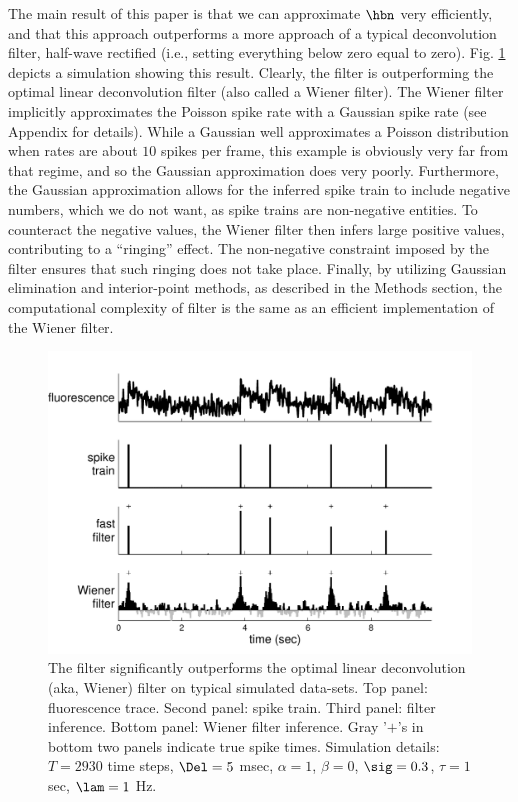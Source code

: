 The main result of this paper is that we can approximate $\hbn$ very efficiently, and that this approach outperforms a more \naive approach of a typical deconvolution filter, half-wave rectified (i.e., setting everything below zero equal to zero).  Fig. \ref{fig:woopsi_inf} depicts a simulation showing this result. Clearly, the \foopsi filter is outperforming the optimal linear deconvolution filter (also called a Wiener filter).  The Wiener filter implicitly approximates the Poisson spike rate with a Gaussian spike rate (see Appendix for details). While a Gaussian well approximates a Poisson distribution when rates are about $10$ spikes per frame, this example is obviously very far from that regime, and so the Gaussian approximation does very poorly. Furthermore, the Gaussian approximation allows for the inferred spike train to include negative numbers, which we do not want, as spike trains are non-negative entities.  To counteract the negative values, the Wiener filter then infers large positive values, contributing to a ``ringing'' effect.  The non-negative constraint imposed by the \foopsi filter ensures that such ringing does not take place.  Finally, by utilizing Gaussian elimination and interior-point methods, as described in the Methods section, the computational complexity of \foopsi filter is the same as an efficient implementation of the Wiener filter.  


\begin{figure}[h!]
\centering \includegraphics[width=.9\linewidth]{../figs/woopsi_inf}
\caption{The \foopsi filter significantly outperforms the optimal linear deconvolution (aka, Wiener) filter on typical simulated data-sets. Top panel: fluorescence trace.  Second panel: spike train.  Third panel: \foopsi filter inference.  Bottom panel: Wiener filter inference.  Gray '$+$'s in bottom two panels indicate true spike times.  Simulation details: $T=2930$ time steps, $\Del=5$ msec, $\alpha=1$, $\beta=0$, $\sig=0.3$, $\tau=1$ sec, $\lam=1$ Hz.} \label{fig:woopsi_inf}
\end{figure}



